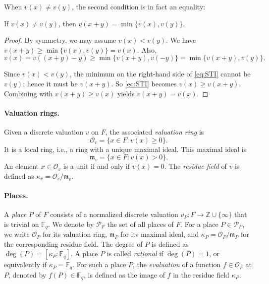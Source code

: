 \documentclass[11pt]{article}
\begin{document}
When $v(x)\neq v(y)$, the second condition is in fact an equality:
\begin{lemma}\label{lem:triangle}
If $v(x)\neq v(y)$, then $v(x+y)=\min\{v(x),v(y)\}$.
\end{lemma}

\begin{proof}
By symmetry, we may assume $v(x)<v(y)$.
We have $v(x+y)\ge \min\{v(x),v(y)\}=v(x)$.
Also,
\begin{equation}\label{eq:STI}
v(x)=v((x+y)-y)\ge \min\{v(x+y),v(-y)\}=\min\{v(x+y),v(y)\}.
\end{equation}

Since $v(x)<v(y)$, the minimum on the right-hand side of \eqref{eq:STI} cannot be $v(y)$; hence it must be
$v(x+y)$. 
So \eqref{eq:STI} becomes $v(x)\ge v(x+y)$. Combining with $v(x+y)\ge v(x)$ yields
$v(x+y)=v(x)$.
\end{proof}

\paragraph{Valuation rings.}
Given a discrete valuation $v$ on $F$, the associated \emph{valuation ring} is
\[
\mathcal{O}_v=\{x\in F : v(x)\ge 0\}.
\]
It is a local ring, i.e., a ring with a unique maximal ideal.
This maximal ideal is
\[
\mathfrak{m}_v=\{x\in F : v(x)>0\}.
\]
An element $x\in \mathcal{O}_v$ is a unit if and only if $v(x)=0$.
The \emph{residue field} of $v$ is defined as $\kappa_v=\mathcal{O}_v/\mathfrak{m}_v$.


\paragraph{Places.}
A \emph{place} $P$ of $F$ consists of a normalized
discrete valuation
$v_P : F \to \mathbb{Z} \cup \{\infty\}$
that is trivial on $\mathbb{F}_q$. We denote by $\mathcal{P}_F$ the set of all places of $F$. For a place $P \in \mathcal{P}_F$, we write $\mathcal{O}_P$ for its valuation ring, $\mathfrak{m}_P$ for its maximal ideal, and $\kappa_P = \mathcal{O}_P / \mathfrak{m}_P$ for the corresponding residue field. The degree of $P$ is defined as $\deg(P) = [\kappa_P : \mathbb{F}_q]$. A place $P$ is called \emph{rational} if $\deg(P)=1$, or equivalently if
$\kappa_P=\mathbb{F}_q$. For such a place $P$, the \emph{evaluation} of a function
$f\in \mathcal{O}_P$ at $P$, denoted by $f(P)\in\mathbb{F}_q$, is defined as the image of $f$ in
the residue field $\kappa_P$.
\end{document}

